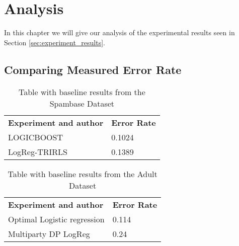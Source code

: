 
\chapter{Analysis}
\label{ch:analysis}
In this chapter we will give our analysis of the experimental results seen in Section \ref{sec:experiment_results}.

\section{Comparing Measured Error Rate}
\begin{table}[h]
	\begin{tabularx}{\textwidth}{|X|l|}
		\textbf{Experiment and author}                                             & \textbf{Error Rate}      \\
		LOGICBOOST\citep{sharma2013adaptive}                                       & 0.1024 \\
		LogReg-TRIRLS\citep{kumar2012comparative}                                  & 0.1389 \\
	\end{tabularx}
	\caption{Table with baseline results from the Spambase Dataset}
	\label{tab:baseline_class_results_spambase}
\end{table}

\begin{table}[h]
\begin{tabularx}{\textwidth}{|X|l|}
	\textbf{Experiment and author}                                                 & \textbf{Error Rate}      \\
	Optimal Logistic regression \citep{caruana2006empirical}   				       & 0.114 \\
	Multiparty DP LogReg \citep{pathak2010diffprivhomo}                            & 0.24 \\	
\end{tabularx}
\caption{Table with baseline results from the Adult Dataset}
\label{tab:baseline_class_results_adult}
\end{table}

	

